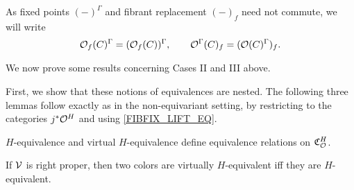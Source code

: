 \documentclass[a4paper,10pt
,draft
]{article}%
\newcommand{\I}{\mathbb I}
\newcommand{\J}{\mathbb J}
\renewcommand{\1}{\eta}%
\begin{document}
\begin{notation}
      As fixed points $(-)^\Gamma$ and fibrant replacement $(-)_f$ need not commute, we will write
      \begin{equation}
            \mathcal{O}_f(C)^\Gamma = (\mathcal{O}_f(C))^\Gamma,
            \qquad
            \mathcal{O}^\Gamma(C)_f = (\mathcal{O}(C)^{\Gamma})_f.
      \end{equation}
\end{notation}


We now prove some results concerning Cases II and III above.

First, we show that these notions of equivalences are nested.
The following three lemmas follow exactly as in the non-equivariant setting,
by restricting to the categories $j^{\**}\O^H$ and using \eqref{FIBFIX_LIFT_EQ}.

\begin{lemma}
      \label{CAV_4.10_LEM}
      $H$-equivalence and virtual $H$-equivalence define equivalence relations on $\mathfrak C_{\mathcal{O}}^H$.
\end{lemma}

        
        
        

\begin{lemma}
      \label{RIGHTPROPER_LEM}
      If $\mathcal V$ is right proper, then two colors are virtually $H$-equivalent iff they are $H$-equivalent. 
\end{lemma}
\end{document}
